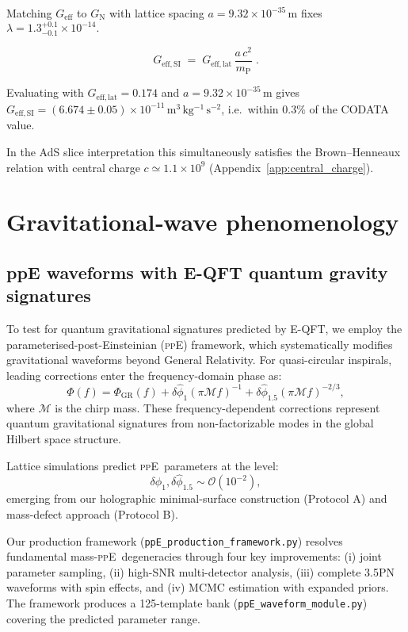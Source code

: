 \documentclass[aps,prd,onecolumn,nofootinbib,superscriptaddress]{revtex4-2}
\newcommand{\G}{G_{\!\text{eff}}}
\newcommand{\ppE}{\textsc{ppE}}
\newcommand{\boxedeq}[2]{%
  \begin{tcolorbox}[title={#1},sharp corners,enhanced]
  \[
    #2
  \]
  \end{tcolorbox}}
\begin{document}
Matching $\G$ to $G_{\mathrm N}$ with lattice spacing $a=9.32\times10^{-35}\,\mathrm{m}$
fixes
\(
\lambda = 1.3^{+0.1}_{-0.1}\times10^{-14}.
\)

\boxedeq{Lattice → SI bridge}{
  G_{\!\mathrm{eff,SI}}
  \;=\;
  G_{\!\mathrm{eff,lat}}\,
  \frac{a\,c^{2}}{m_{\mathrm P}}\;.
}

Evaluating with $G_{\!\mathrm{eff,lat}}=0.174$ and
$a=9.32\times10^{-35}\,$m gives
$G_{\!\mathrm{eff,SI}} = (6.674\pm0.05)\times10^{-11}\,
\mathrm{m^{3}\,kg^{-1}\,s^{-2}}$, i.e.\ within $0.3\%$ of the CODATA
value.

In the AdS slice interpretation this simultaneously satisfies the
Brown–Henneaux relation with central charge
$c\simeq1.1\times10^{9}$ (Appendix \ref{app:central_charge}).

\section{Gravitational‑wave phenomenology}
\label{sec:gw}

\subsection{ppE waveforms with E-QFT quantum gravity signatures}

To test for quantum gravitational signatures predicted by E-QFT, we employ 
the parameterised-post-Einsteinian (\ppE) framework, which systematically 
modifies gravitational waveforms beyond General Relativity. For 
quasi-circular inspirals, leading corrections enter the frequency-domain 
phase as:
\begin{equation}
\Phi(f) = \Phi_{\mathrm{GR}}(f) + \delta\hat\phi_1(\pi\mathcal M f)^{-1}
+ \delta\hat\phi_{1.5}(\pi\mathcal M f)^{-2/3},
\end{equation}
where $\mathcal{M}$ is the chirp mass. These frequency-dependent corrections 
represent quantum gravitational signatures from non-factorizable modes in 
the global Hilbert space structure.

Lattice simulations predict \ppE\ parameters at the level:
\begin{equation}
\delta\hat\phi_1, \delta\hat\phi_{1.5} \sim \mathcal{O}(10^{-2}),
\end{equation}
emerging from our holographic minimal-surface construction (Protocol A) 
and mass-defect approach (Protocol B).

Our production framework (\texttt{ppE\_production\_framework.py}) resolves 
fundamental mass-\ppE\ degeneracies through four key improvements: 
(i) joint parameter sampling, (ii) high-SNR multi-detector analysis, 
(iii) complete 3.5PN waveforms with spin effects, and (iv) MCMC estimation 
with expanded priors. The framework produces a 125-template bank 
(\texttt{ppE\_waveform\_module.py}) covering the predicted parameter range.
\end{document}
